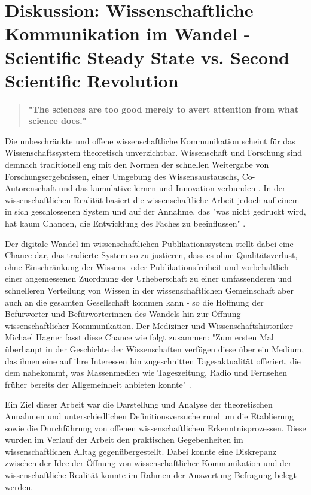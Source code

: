 \chapter{Diskussion: Wissenschaftliche Kommunikation im Wandel - Scientific Steady State vs. Second Scientific Revolution}

\begin{quote}
\textbf{"The sciences are too good merely to avert attention from what science does."}
\end{quote} \cite{kittler_2004}

Die unbeschränkte und offene wissenschaftliche Kommunikation scheint für das Wissenschaftssystem theoretisch unverzichtbar. Wissenschaft und Forschung sind demnach traditionell eng mit den Normen der schnellen Weitergabe von Forschungsergebnissen, einer Umgebung des Wissensaustauschs, Co-Autorenschaft und das kumulative lernen und Innovation verbunden \cite{Partha_1994_economics_science}. In der wissenschaftlichen Realität basiert die wissenschaftliche Arbeit jedoch auf einem in sich geschlossenen System und auf der Annahme, das "was nicht gedruckt wird, hat kaum Chancen, die Entwicklung des Faches zu beeinflussen" \cite{luhmann_1997_gesellschaft}.

Der digitale Wandel im wissenschaftlichen Publikationssystem stellt dabei eine Chance dar, das tradierte System so zu justieren, dass es ohne Qualitätsverlust, ohne Einschränkung der Wissens- oder Publikationsfreiheit und vorbehaltlich einer angemessenen Zuordnung der Urheberschaft zu einer umfassenderen und schnelleren Verteilung von Wissen in der wissenschaftlichen Gemeinschaft aber auch an die gesamten Gesellschaft kommen kann - so die Hoffnung der Befürworter und Befürworterinnen des Wandels hin zur Öffnung wissenschaftlicher Kommunikation. Der Mediziner und Wissenschaftshistoriker Michael Hagner fasst diese Chance wie folgt zusammen: "Zum ersten Mal überhaupt in der Geschichte der Wissenschaften verfügen diese über ein Medium, das ihnen eine auf ihre Interessen hin zugeschnitten Tagesaktualität offeriert, die dem nahekommt, was Massenmedien wie Tageszeitung, Radio und Fernsehen früher bereits der Allgemeinheit anbieten konnte" \cite{hagner_2015_sache_buches}.

Ein Ziel dieser Arbeit war die Darstellung und Analyse der theoretischen Annahmen und unterschiedlichen Definitionsversuche rund um die Etablierung sowie die Durchführung von offenen wissenschaftlichen Erkenntnisprozessen. Diese wurden im Verlauf der Arbeit den praktischen Gegebenheiten im wissenschaftlichen Alltag gegenübergestellt. Dabei konnte eine Diskrepanz zwischen der Idee der Öffnung von wissenschaftlicher Kommunikation und der wissenschaftliche Realität \cite{Scheliga_2014} konnte im Rahmen der Auswertung Befragung belegt werden.

